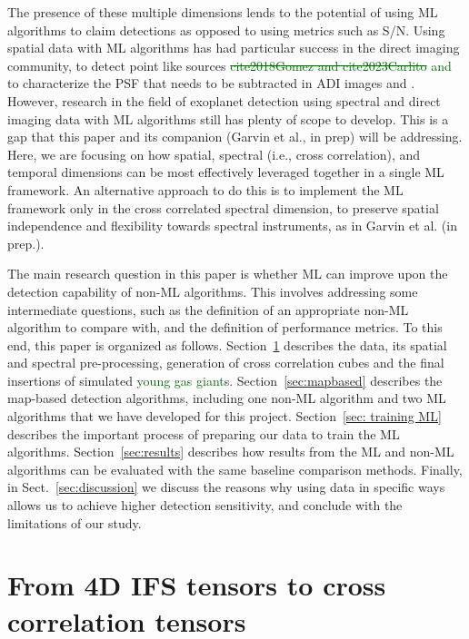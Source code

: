 \documentclass{aa}
\newcommand{\newchange}[1]{\textcolor{darkgreen}{#1}}
\begin{document}
The presence of these multiple dimensions lends to the potential of using ML algorithms to claim detections as opposed to using metrics such as S/N.
Using spatial data with ML algorithms has had particular success in the direct imaging community, to detect point like sources \newchange{\sout{ cite{2018Gomez} and cite{2023Carlito} } \citet{2018Gomez} and \citet{2023Carlito}} to characterize the PSF that needs to be subtracted in ADI images \cite{2022Gebhard} and \cite{2023Flasseur}.
However, research in the field of exoplanet detection using spectral and direct imaging data with ML algorithms still has plenty of scope to develop. This is a gap that this paper and its companion (Garvin et al., in prep) will be addressing.
Here, we are focusing on how spatial, spectral (i.e., cross correlation), and temporal dimensions can be most effectively leveraged together in a single ML framework. 
An alternative approach to do this is to implement the ML framework only in the cross correlated spectral dimension, to preserve spatial independence and flexibility towards spectral instruments, as in Garvin et al. (in prep.).

The main research question in this paper is whether ML can improve upon the detection capability of non-ML algorithms. This involves addressing some intermediate questions, such as the definition of an appropriate non-ML algorithm to compare with, and the definition of performance metrics.
To this end, this paper is organized as follows. Section~\ref{sec:data} describes the data, its spatial and spectral pre-processing, generation of cross correlation cubes and the final insertions of simulated \newchange{young gas giant}s.
Section~\ref{sec:mapbased} describes the map-based detection algorithms, including one non-ML algorithm and two ML algorithms that we have developed for this project.
Section~\ref{sec: training ML} describes the important process of preparing our data to train the ML algorithms.
Section~\ref{sec:results} describes how results from the ML and non-ML algorithms can be evaluated with the same baseline comparison methods.
Finally, in Sect.~\ref{sec:discussion} we discuss the reasons why using data in specific ways allows us to achieve higher detection sensitivity, and conclude with the limitations of our study.



\section{From 4D IFS tensors to cross correlation tensors}\label{sec:data}
\end{document}
